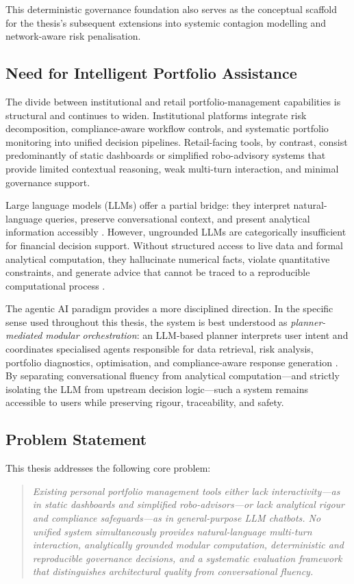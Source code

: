 \documentclass[11pt]{article}
\begin{document}
This deterministic governance foundation also serves as the conceptual scaffold for the thesis's subsequent extensions into systemic contagion modelling and network-aware risk penalisation.

\subsection{Need for Intelligent Portfolio Assistance}
The divide between institutional and retail portfolio-management capabilities is structural and continues to widen. Institutional platforms integrate risk decomposition, compliance-aware workflow controls, and systematic portfolio monitoring into unified decision pipelines. Retail-facing tools, by contrast, consist predominantly of static dashboards or simplified robo-advisory systems that provide limited contextual reasoning, weak multi-turn interaction, and minimal governance support.

Large language models (LLMs) offer a partial bridge: they interpret natural-language queries, preserve conversational context, and present analytical information accessibly \cite{li2023,wu2023,zhao2023}. However, ungrounded LLMs are categorically insufficient for financial decision support. Without structured access to live data and formal analytical computation, they hallucinate numerical facts, violate quantitative constraints, and generate advice that cannot be traced to a reproducible computational process \cite{ji2023,adadi2018,arrieta2020}.

The agentic AI paradigm provides a more disciplined direction. In the specific sense used throughout this thesis, the system is best understood as \emph{planner-mediated modular orchestration}: an LLM-based planner interprets user intent and coordinates specialised agents responsible for data retrieval, risk analysis, portfolio diagnostics, optimisation, and compliance-aware response generation \cite{jennings1998,wooldridge2009,hayesroth1985}. By separating conversational fluency from analytical computation---and strictly isolating the LLM from upstream decision logic---such a system remains accessible to users while preserving rigour, traceability, and safety.

\subsection{Problem Statement}
This thesis addresses the following core problem:

\begin{quote}
\textit{Existing personal portfolio management tools either lack interactivity---as in static dashboards and simplified robo-advisors---or lack analytical rigour and compliance safeguards---as in general-purpose LLM chatbots. No unified system simultaneously provides natural-language multi-turn interaction, analytically grounded modular computation, deterministic and reproducible governance decisions, and a systematic evaluation framework that distinguishes architectural quality from conversational fluency.}
\end{quote}
\end{document}
